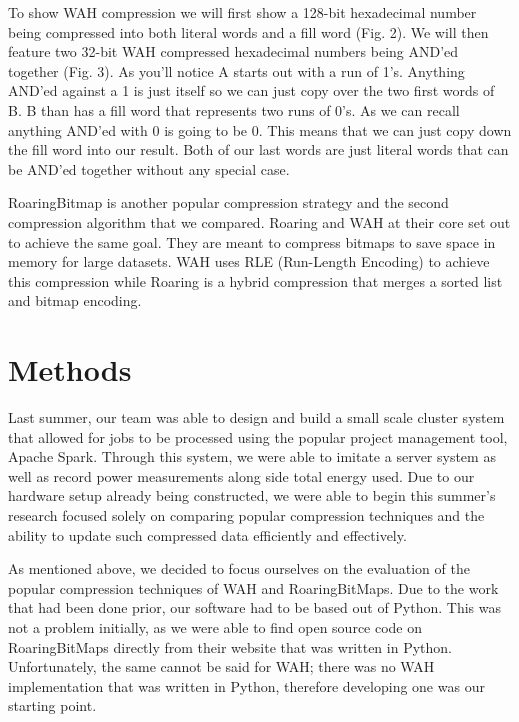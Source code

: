 \documentclass{article}
\begin{document}
To show WAH compression we will first show a 128-bit hexadecimal number being compressed into both literal words and a fill word (Fig. 2). We will then feature two 32-bit WAH compressed hexadecimal numbers being AND’ed together (Fig. 3). As you’ll notice A starts out with a run of 1’s. Anything AND’ed against a 1 is just itself so we can just copy over the two first words of B. B than has a fill word that represents two runs of 0’s. As we can recall anything AND’ed with 0 is going to be 0. This means that we can just copy down the fill word into our result. Both of our last words are just literal words that can be AND’ed together without any special case. \par



RoaringBitmap is another popular compression strategy and the second compression algorithm that we compared. Roaring and WAH at their core set out to achieve the same goal. They are meant to compress bitmaps to save space in memory for large datasets. WAH uses RLE (Run-Length Encoding) to achieve this compression while Roaring is a hybrid compression that merges a sorted list and bitmap encoding. \par


%
%
\section{Methods}
Last summer, our team was able to design and build a small scale cluster system that allowed for jobs to be processed using the popular project management tool, Apache Spark. Through this system, we were able to imitate a server system as well as record power measurements along side total energy used. Due to our hardware setup already being constructed, we were able to begin this summer's research focused solely on comparing popular compression techniques and the ability to update such compressed data efficiently and effectively. \par 
As mentioned above, we decided to focus ourselves on the evaluation of the popular compression techniques of WAH and RoaringBitMaps. Due to the work that had been done prior, our software had to be based out of Python. This was not a problem initially, as we were able to find open source code on RoaringBitMaps directly from their website that was written in Python. Unfortunately, the same cannot be said for WAH; there was no WAH implementation that was written in Python, therefore developing one was our starting point. \par
\end{document}
